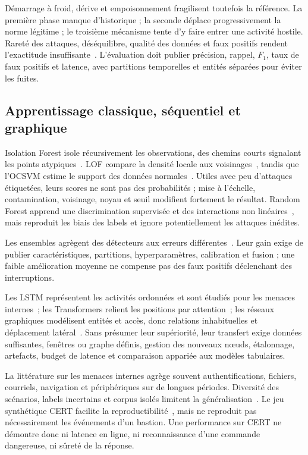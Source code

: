 \documentclass[11pt,a4paper,oneside]{report}
\theoremstyle{definition}
\theoremstyle{plain}
\begin{document}
Démarrage à froid, dérive et empoisonnement fragilisent toutefois la référence. La première phase manque d'historique ; la seconde déplace progressivement la norme légitime ; le troisième mécanisme tente d'y faire entrer une activité hostile. Rareté des attaques, déséquilibre, qualité des données et faux positifs rendent l'exactitude insuffisante~\cite{ref7,ref24,ref32,ref40}. L'évaluation doit publier précision, rappel, $F_1$, taux de faux positifs et latence, avec partitions temporelles et entités séparées pour éviter les fuites.

\subsection{Apprentissage classique, séquentiel et graphique}

Isolation Forest isole récursivement les observations, des chemins courts signalant les points atypiques~\cite{ref8}. LOF compare la densité locale aux voisinages~\cite{ref19}, tandis que l'OCSVM estime le support des données normales~\cite{ref20}. Utiles avec peu d'attaques étiquetées, leurs scores ne sont pas des probabilités ; mise à l'échelle, contamination, voisinage, noyau et seuil modifient fortement le résultat. Random Forest apprend une discrimination supervisée et des interactions non linéaires~\cite{ref30}, mais reproduit les biais des labels et ignore potentiellement les attaques inédites.

Les ensembles agrègent des détecteurs aux erreurs différentes~\cite{ref48}. Leur gain exige de publier caractéristiques, partitions, hyperparamètres, calibration et fusion ; une faible amélioration moyenne ne compense pas des faux positifs déclenchant des interruptions.

Les LSTM représentent les activités ordonnées et sont étudiés pour les menaces internes~\cite{ref10,ref31,ref44}; les Transformers relient les positions par attention~\cite{ref36}; les réseaux graphiques modélisent entités et accès, donc relations inhabituelles et déplacement latéral~\cite{ref23}. Sans présumer leur supériorité, leur transfert exige données suffisantes, fenêtres ou graphe définis, gestion des nouveaux nœuds, étalonnage, artefacts, budget de latence et comparaison appariée aux modèles tabulaires.

La littérature sur les menaces internes agrège souvent authentifications, fichiers, courriels, navigation et périphériques sur de longues périodes. Diversité des scénarios, labels incertains et corpus isolés limitent la généralisation~\cite{ref6,ref7,ref24,ref32,ref40}. Le jeu synthétique CERT facilite la reproductibilité~\cite{ref43}, mais ne reproduit pas nécessairement les événements d'un bastion. Une performance sur CERT ne démontre donc ni latence en ligne, ni reconnaissance d'une commande dangereuse, ni sûreté de la réponse.
\end{document}
